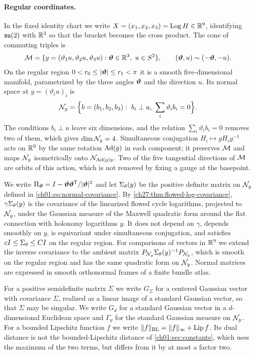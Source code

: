 \paragraph{Regular coordinates.}
In the fixed identity chart we write $X=(x_1,x_2,x_3)=\operatorname{Log} H\in\mathbb R^9$, identifying $\mathfrak{su}(2)$ with $\mathbb R^3$ so that the bracket becomes the cross product. The cone of commuting triples is
\[
 \CommMan=\{y=(\vartheta_1u,\vartheta_2u,\vartheta_3u):\Toron\in\R^3,\ u\in S^2\},\qquad(\Toron,u)\sim(-\Toron,-u).
\]
On the regular region $0<r_0\le\lvert \bm\vartheta\rvert\le r_1<\pi$ it is a smooth five-dimensional manifold, parametrized by the three angles $\bm\vartheta$ and the direction $u$. Its normal space at $y=(\vartheta_iu)_i$ is
\[
 \NormalFiber y=\Bigl\{b=(b_1,b_2,b_3):\ b_i\perp u,\ \sum_i\vartheta_ib_i=0\Bigr\}.
\]
The conditions $b_i\perp u$ leave six dimensions, and the relation $\sum_i\vartheta_ib_i=0$ removes two of them, which gives $\dim\mathcal N_{y}=4$. Simultaneous conjugation $H_i\mapsto gH_ig^{-1}$ acts on $\mathbb R^9$ by the same rotation $\operatorname{Ad}(g)$ in each component; it preserves $\mathcal M$ and maps $\mathcal N_{y}$ isometrically onto $\mathcal N_{\operatorname{Ad}(g)y}$. Two of the five tangential directions of $\mathcal M$ are orbits of this action, which is not removed by fixing a gauge at the basepoint.

We write $\Pi_{\bm\vartheta}=I-\bm\vartheta\bm\vartheta^{\mathsf T}/\lvert \bm\vartheta\rvert^2$ and let $\Sigma_\theta(y)$ be the positive definite matrix on $\mathcal N_{y}$ defined in \eqref{ch01:eq:normal-covariance}. By \cref{ch27:thm:flowed-log-covariance}, $\gamma\Sigma_\theta(y)$ is the covariance of the linearized flowed cycle logarithms, projected to $\mathcal N_{y}$, under the Gaussian measure of the Maxwell quadratic form around the flat connection with holonomy logarithms $y$. It does not depend on $\gamma$, depends smoothly on $y$, is equivariant under simultaneous conjugation, and satisfies $cI\le\Sigma_\theta\le CI$ on the regular region. For comparisons of vectors in $\mathbb R^9$ we extend the inverse covariance to the ambient matrix $P_{\mathcal N_{y}}\Sigma_\theta(y)^{-1}P_{\mathcal N_{y}}$, which is smooth on the regular region and has the same quadratic form on $\mathcal N_{y}$. Normal matrices are expressed in smooth orthonormal frames of a finite bundle atlas.

For a positive semidefinite matrix $\Sigma$ we write $G_\Sigma$ for a centered Gaussian vector with covariance $\Sigma$, realized as a linear image of a standard Gaussian vector, so that $\Sigma$ may be singular. We write $G_d$ for a standard Gaussian vector in a $d$-dimensional Euclidean space and $\Gamma_y$ for the standard Gaussian measure on $\mathcal N_{y}$. For a bounded Lipschitz function $f$ we write $\lVert f\rVert_{\rm BL}=\lVert f\rVert_\infty+\operatorname{Lip} f$. Its dual distance is not the bounded-Lipschitz distance of \cref{ch01:sec:constants}, which uses the maximum of the two terms, but differs from it by at most a factor two.

